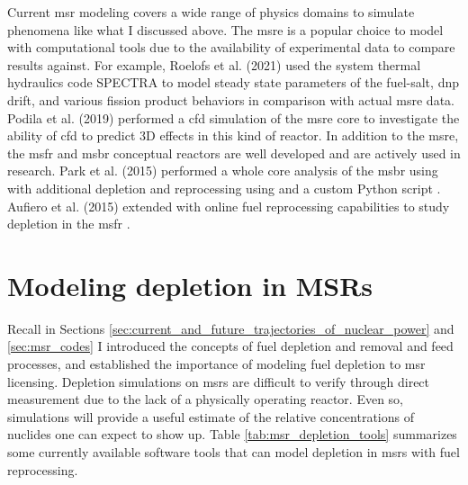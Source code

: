 Current \Gls{msr} modeling covers a wide range of physics domains to simulate
phenomena like what I discussed above.
The \Gls{msre} is a popular choice to model with computational tools due to the
availability of experimental data to compare results against. For example,
Roelofs et al. (2021) \cite{roelofs_molten_2021} used the system thermal hydraulics code SPECTRA to model
steady state parameters of the fuel-salt, \gls{dnp} drift, and various fission
product behaviors in comparison with actual \Gls{msre} data.
Podila et al. (2019) \cite{podila_cfd_2019} performed a \Gls{cfd} simulation of the \Gls{msre} core to
investigate the ability of \Gls{cfd} to predict 3D effects in this kind of
reactor. In addition to the \Gls{msre}, the \Gls{msfr} \cite{merle-lucotte_launching_2011}
and \Gls{msbr} \cite{robertson_conceptual_1971} conceptual reactors are well
developed and are actively used in research. Park et al. (2015) performed a
whole core analysis of the \Gls{msbr} using \MCNPSIX with additional depletion
and reprocessing using \CINDERNINETY and a custom Python script \cite{park_whole_2015}. Aufiero et al. (2015) extended \SerpentTWO with online
fuel reprocessing capabilities to study depletion in the \Gls{msfr}
\cite{aufiero_extended_2013}. 

\section{Modeling depletion in MSRs} Recall in Sections
\ref{sec:current_and_future_trajectories_of_nuclear_power} and \ref{sec:msr_codes} I introduced the
concepts of fuel depletion and removal and feed processes, and established
the importance of modeling fuel depletion to \Gls{msr} licensing. Depletion
simulations on \Gls{msr}s are difficult to verify through direct
measurement due to the lack of a physically operating reactor. Even so,
simulations will provide a useful estimate of the relative concentrations of
nuclides one can expect to show up. Table \ref{tab:msr_depletion_tools}
summarizes some currently available software tools that can model depletion in
\Gls{msr}s with fuel reprocessing. 

